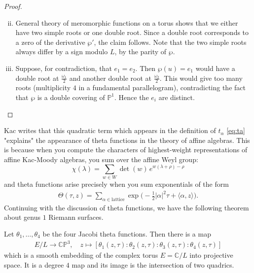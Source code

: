 \documentclass[12pt]{article}
\begin{document}
\begin{proof}
\leavevmode
\begin{enumerate}[(i)]
    \setcounter{enumi}{1}
    \item General theory of meromorphic functions on a torus shows that we either have two simple roots or one double root. Since a double root corresponds to a zero of the derivative $\wp'$, the claim follows. Note that the two simple roots always differ by a sign modulo $L$, by the parity of $\wp$.
    
    \setcounter{enumi}{0}
    \item Suppose, for contradiction, that $e_1=e_2$. Then $\wp(u)=e_1$ would have a double root at $\tfrac{\omega_1}{2}$ and another double root at $\tfrac{\omega_2}{2}$. This would give too many roots (multiplicity $4$ in a fundamental parallelogram), contradicting the fact that $\wp$ is a double covering of $\mathbb{P}^1$. Hence the $e_i$ are distinct.
\end{enumerate}
\end{proof}
\begin{remark}
    Kac writes that this quadratic term which appears in the definition of $t_\alpha$ \ref{eq:ta} "explains" the appearance of theta functions in the theory of affine algebras. This is because when you compute the characters of highest-weight representations of affine Kac-Moody algebras, you sum over the affine Weyl group:
\[\chi(\lambda) = \sum_{w \in W} \det(w)\, e^{w(\lambda+\rho) - \rho}\]
and theta functions arise precisely when you sum exponentials of the form \begin{align*}
    \Theta(\tau, z) = \sum_{\alpha \in \text{lattice}} \exp\!\big(-\tfrac{1}{2}|\alpha|^2 \tau + \langle \alpha, z\rangle\big).
\end{align*}
Continuing with the discussion of theta functions, we have the following theorem about genus $1$ Riemann surfaces.
\end{remark}

\begin{theorem}
    Let $\theta_1,\dots,\theta_4$ be the four Jacobi theta functions. Then there is a map \begin{align*}
        E/L \to \mathbb{CP}^3, \quad z \mapsto [\theta_1(z,\tau):\theta_2(z,\tau):\theta_3(z,\tau):\theta_4(z,\tau)]
    \end{align*} which is a smooth embedding of the complex torus $E=\mathbb{C}/L$ into projective space. It is a degree $4$ map and its image is the intersection of two quadrics.
\end{theorem}
\end{document}
